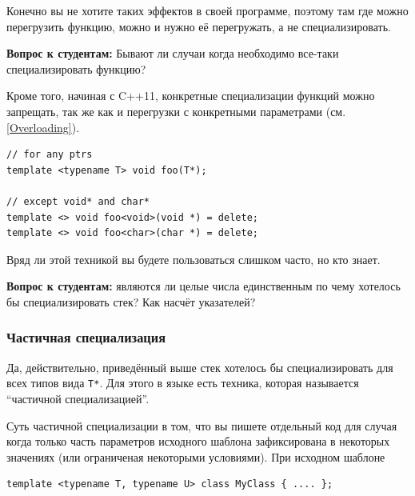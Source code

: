 \documentclass[a4paper,12pt,oneside]{article}
\newif\ifanswers
\begin{document}
Конечно вы не хотите таких эффектов в своей программе, поэтому там где можно перегрузить функцию, можно и нужно её перегружать, а не специализировать.

\textbf{Вопрос к студентам:} Бывают ли случаи когда необходимо все-таки специализировать функцию?

\ifanswers
Правильный ответ следует из предыдущего параграфа: это как раз те случаи, когда её \textbf{нельзя} перегрузить. Например стандарт регламентирует, что перегрузка функций из пространства имен \lstinline!std! запрещена, но часто хочется \lstinline!std::swap! для своих типов, в этом случае специализация -- единственный выход.
\fi

Кроме того, начиная с C++11, конкретные специализации функций можно запрещать, так же как и перегрузки с конкретными параметрами (см. \ref{Overloading}).

\begin{lstlisting}
// for any ptrs
template <typename T> void foo(T*); 

// except void* and char*
template <> void foo<void>(void *) = delete;
template <> void foo<char>(char *) = delete;
\end{lstlisting}

Вряд ли этой техникой вы будете пользоваться слишком часто, но кто знает.

\textbf{Вопрос к студентам:} являются ли целые числа единственным по чему хотелось бы специализировать стек? Как насчёт указателей?

\ifanswers
Вопрос, разумеется, риторический.
\fi

\subsubsection{Частичная специализация}\label{PartialSpec}

Да, действительно, приведённый выше стек хотелось бы специализировать для всех типов вида \lstinline!T*!. Для этого в языке есть техника, которая называется ``частичной специализацией''.

Суть частичной специализации в том, что вы пишете отдельный код для случая когда только часть параметров исходного шаблона зафиксирована в некоторых значениях (или ограниченая некоторыми условиями). При исходном шаблоне

\begin{lstlisting}
template <typename T, typename U> class MyClass { .... };
\end{lstlisting}
\end{document}
